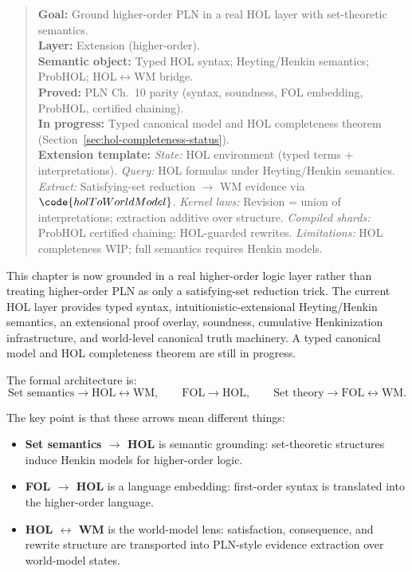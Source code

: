 \documentclass[11pt,openany]{report}
\begin{document}
\begin{quote}\small
\textbf{Goal:} Ground higher-order PLN in a real HOL layer with set-theoretic semantics.\\
\textbf{Layer:} Extension (higher-order).\\
\textbf{Semantic object:} Typed HOL syntax; Heyting/Henkin semantics; ProbHOL; HOL$\leftrightarrow$WM bridge.\\
\textbf{Proved:} PLN Ch.~10 parity (syntax, soundness, FOL embedding, ProbHOL, certified chaining).\\
\textbf{In progress:} Typed canonical model and HOL completeness theorem (Section~\ref{sec:hol-completeness-status}).\\[4pt]
\textbf{Extension template:}
\textit{State:} HOL environment (typed terms + interpretations).
\textit{Query:} HOL formulas under Heyting/Henkin semantics.
\textit{Extract:} Satisfying-set reduction $\to$ WM evidence via $\code{holToWorldModel}$.
\textit{Kernel laws:} Revision = union of interpretations; extraction additive over structure.
\textit{Compiled shards:} ProbHOL certified chaining; HOL-guarded rewrites.
\textit{Limitations:} HOL completeness WIP; full semantics requires Henkin models.
\end{quote}

This chapter is now grounded in a real higher-order logic layer rather than
treating higher-order PLN as only a satisfying-set reduction trick.
The current HOL layer provides typed syntax, intuitionistic-extensional
Heyting/Henkin semantics, an extensional proof overlay, soundness, cumulative
Henkinization infrastructure, and world-level canonical truth machinery.
A typed canonical model and HOL completeness theorem are still in progress.

The formal architecture is:
\[
  \text{Set semantics} \longrightarrow \text{HOL} \longleftrightarrow \text{WM},
  \qquad
  \text{FOL} \longrightarrow \text{HOL},
  \qquad
  \text{Set theory} \longrightarrow \text{FOL} \longleftrightarrow \text{WM}.
\]

The key point is that these arrows mean different things:
\begin{itemize}
\item \textbf{Set semantics $\to$ HOL} is semantic grounding: set-theoretic
  structures induce Henkin models for higher-order logic.
\item \textbf{FOL $\to$ HOL} is a language embedding: first-order syntax is
  translated into the higher-order language.
\item \textbf{HOL $\leftrightarrow$ WM} is the world-model lens: satisfaction,
  consequence, and rewrite structure are transported into PLN-style evidence
  extraction over world-model states.
\end{itemize}
\end{document}
